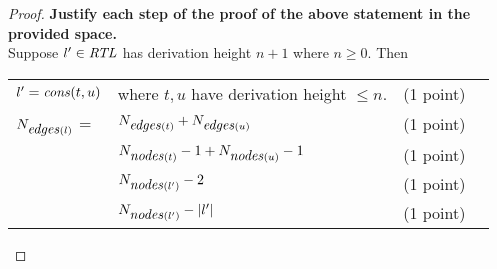 \documentclass[addpoints]{exam}
\begin{document}
\begin{questions}
\begin{proof}
\textbf{\color{blue} Justify each step of the proof of the above statement in the provided space. }\\


Suppose $l' \in \mbox{\it RTL\/}$ has derivation height $n+1$ where $n\geq 0$. Then \\



\begin{tabular}{llrl}
		\vspace{5mm}
		
	$l' = \mbox{\it cons\/}(t, u)$ & where $t, u$ have derivation height $\leq n$. &\hspace{15mm}  {\color{blue}(1 point)}& {\color{blue}\underline{\hspace{4cm}} } \\
	\vspace{5mm}
	
	 $N_{\mbox{\it edges\/}(l)}$ = & $N_{\mbox{\it edges\/}(t)} + N_{\mbox{\it edges\/}(u)}$   & {\color{blue}(1 point)}& {\color{blue}\underline{\hspace{4cm}} } \\
	 	\vspace{5mm}
	 	
	& $N_{\mbox{\it nodes\/}(t)} -1 + N_{\mbox{\it nodes\/}(u)} -1$  & {\color{blue}(1 point)}& {\color{blue}\underline{\hspace{4cm}} } \\
		\vspace{5mm}

	& $N_{\mbox{\it nodes\/}(l')} -2$  & {\color{blue}(1 point)}& {\color{blue}\underline{\hspace{4cm}} } \\
		\vspace{5mm}
		
	& $N_{\mbox{\it nodes\/}(l')} -|l'|$  & {\color{blue}(1 point)}& {\color{blue}\underline{\hspace{4cm}} }
\end{tabular}

\end{proof}

%




\end{questions}
\end{document}

